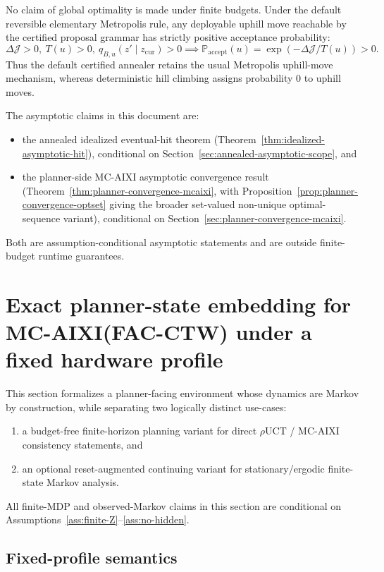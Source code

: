 \documentclass[11pt]{article}
\begin{document}
No claim of global optimality is made under finite budgets. Under the default
reversible elementary Metropolis rule, any deployable uphill move reachable by
the certified proposal grammar has strictly positive acceptance probability:
\[
\Delta\mathcal{J}>0,\ T(u)>0,\ q_{B,u}(z'\mid z_{\mathrm{cur}})>0
\implies
\mathbb{P}_{\mathrm{accept}}(u)=
\exp(-\Delta\mathcal{J}/T(u))>0.
\]
Thus the default certified annealer retains the usual Metropolis uphill-move
mechanism, whereas deterministic hill climbing assigns probability $0$ to
uphill moves.

The asymptotic claims in this document are:
\begin{itemize}
    \item the annealed idealized eventual-hit theorem
    (Theorem~\ref{thm:idealized-asymptotic-hit}), conditional on
    Section~\ref{sec:annealed-asymptotic-scope}, and
    \item the planner-side MC-AIXI asymptotic convergence result
    (Theorem~\ref{thm:planner-convergence-mcaixi}, with
    Proposition~\ref{prop:planner-convergence-optset} giving the broader
    set-valued non-unique optimal-sequence variant), conditional on
    Section~\ref{sec:planner-convergence-mcaixi}.
\end{itemize}
Both are assumption-conditional asymptotic statements and are outside
finite-budget runtime guarantees.

\section{Exact planner-state embedding for MC-AIXI(FAC-CTW) under a fixed hardware profile}\label{sec:aixi-embedding}

This section formalizes a planner-facing environment whose dynamics are Markov
by construction, while separating two logically distinct use-cases:
\begin{enumerate}
    \item a budget-free finite-horizon planning variant for direct
    $\rho$UCT / MC-AIXI consistency statements, and
    \item an optional reset-augmented continuing variant for stationary/ergodic
    finite-state Markov analysis.
\end{enumerate}
All finite-MDP and observed-Markov claims in this section are conditional on
Assumptions~\ref{ass:finite-Z}--\ref{ass:no-hidden}.

\subsection{Fixed-profile semantics}
\end{document}
